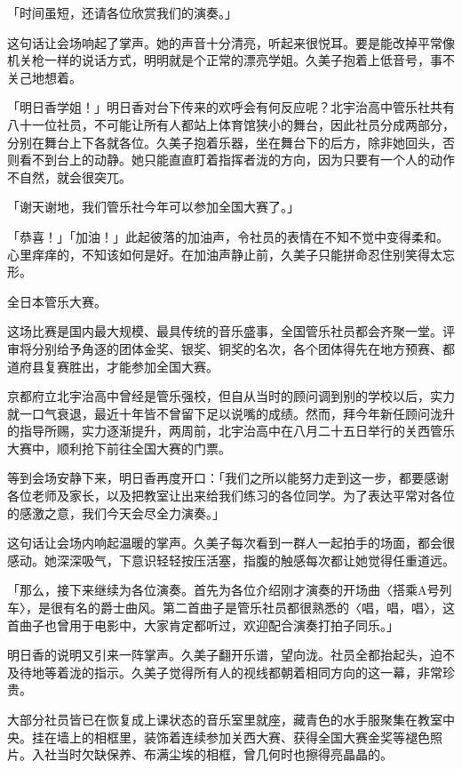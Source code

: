 \documentclass[UTF8]{ctexart}
\begin{document}
    「时间虽短，还请各位欣赏我们的演奏。」 

    这句话让会场响起了掌声。她的声音十分清亮，听起来很悦耳。要是能改掉平常像机关枪一样的说话方式，明明就是个正常的漂亮学姐。久美子抱着上低音号，事不关己地想着。 

    「明日香学姐！」明日香对台下传来的欢呼会有何反应呢？北宇治高中管乐社共有八十一位社员，不可能让所有人都站上体育馆狭小的舞台，因此社员分成两部分，分别在舞台上下各就各位。久美子抱着乐器，坐在舞台下的后方，除非她回头，否则看不到台上的动静。她只能直直盯着指挥者泷的方向，因为只要有一个人的动作不自然，就会很突兀。 

    「谢天谢地，我们管乐社今年可以参加全国大赛了。」 

    「恭喜！」「加油！」此起彼落的加油声，令社员的表情在不知不觉中变得柔和。心里痒痒的，不知该如何是好。在加油声静止前，久美子只能拼命忍住别笑得太忘形。 

    全日本管乐大赛。 

    这场比赛是国内最大规模、最具传统的音乐盛事，全国管乐社员都会齐聚一堂。评审将分别给予角逐的团体金奖、银奖、铜奖的名次，各个团体得先在地方预赛、都道府县复赛胜出，才能参加全国大赛。 

    京都府立北宇治高中曾经是管乐强校，但自从当时的顾问调到别的学校以后，实力就一口气衰退，最近十年皆不曾留下足以说嘴的成绩。然而，拜今年新任顾问泷升的指导所赐，实力逐渐提升，两周前，北宇治高中在八月二十五日举行的关西管乐大赛中，顺利抢下前往全国大赛的门票。 

    等到会场安静下来，明日香再度开口：「我们之所以能努力走到这一步，都要感谢各位老师及家长，以及把教室让出来给我们练习的各位同学。为了表达平常对各位的感激之意，我们今天会尽全力演奏。」 

    这句话让会场内响起温暖的掌声。久美子每次看到一群人一起拍手的场面，都会很感动。她深深吸气，下意识轻轻按压活塞，指腹的触感每次都让她觉得任重道远。 

    「那么，接下来继续为各位演奏。首先为各位介绍刚才演奏的开场曲〈搭乘A号列车〉，是很有名的爵士曲风。第二首曲子是管乐社员都很熟悉的〈唱，唱，唱〉，这首曲子也曾用于电影中，大家肯定都听过，欢迎配合演奏打拍子同乐。」 

    明日香的说明又引来一阵掌声。久美子翻开乐谱，望向泷。社员全都抬起头，迫不及待地等着泷的指示。久美子觉得所有人的视线都朝着相同方向的这一幕，非常珍贵。 

    大部分社员皆已在恢复成上课状态的音乐室里就座，藏青色的水手服聚集在教室中央。挂在墙上的相框里，装饰着连续参加关西大赛、获得全国大赛金奖等褪色照片。入社当时欠缺保养、布满尘埃的相框，曾几何时也擦得亮晶晶的。 
\end{document}
